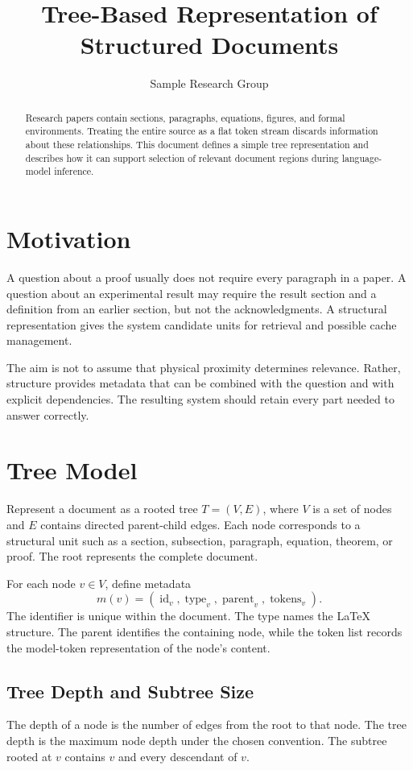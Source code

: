 \documentclass{article}
\title{Tree-Based Representation of Structured Documents}
\author{Sample Research Group}
\date{}
\begin{document}
\maketitle

\begin{abstract}
Research papers contain sections, paragraphs, equations, figures, and formal environments. Treating the entire source as a flat token stream discards information about these relationships. This document defines a simple tree representation and describes how it can support selection of relevant document regions during language-model inference.
\end{abstract}

\section{Motivation}
A question about a proof usually does not require every paragraph in a paper. A question about an experimental result may require the result section and a definition from an earlier section, but not the acknowledgments. A structural representation gives the system candidate units for retrieval and possible cache management.

The aim is not to assume that physical proximity determines relevance. Rather, structure provides metadata that can be combined with the question and with explicit dependencies. The resulting system should retain every part needed to answer correctly.

\section{Tree Model}
Represent a document as a rooted tree $T=(V,E)$, where $V$ is a set of nodes and $E$ contains directed parent-child edges. Each node corresponds to a structural unit such as a section, subsection, paragraph, equation, theorem, or proof. The root represents the complete document.

For each node $v\in V$, define metadata
\begin{equation}
m(v)=(\operatorname{id}_v,\operatorname{type}_v,
\operatorname{parent}_v,\operatorname{tokens}_v).
\end{equation}
The identifier is unique within the document. The type names the LaTeX structure. The parent identifies the containing node, while the token list records the model-token representation of the node's content.

\subsection{Tree Depth and Subtree Size}
The depth of a node is the number of edges from the root to that node. The tree depth is the maximum node depth under the chosen convention. The subtree rooted at $v$ contains $v$ and every descendant of $v$.
\end{document}
